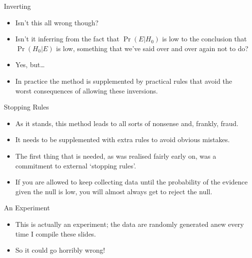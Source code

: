 \documentclass[
  ignorenonframetext,
]{beamer}
\providecommand{\tightlist}{%
  \setlength{\itemsep}{0pt}\setlength{\parskip}{0pt}}
\renewcommand{\,}{\text{, }}
\begin{document}
\begin{frame}{Inverting}
\protect\hypertarget{inverting-1}{}

\begin{itemize}
\tightlist
\item
  Isn't this all wrong though?
\item
  Isn't it inferring from the fact that \(\Pr(E | H_0)\) is low to the
  conclusion that \(\Pr(H_0 | E)\) is low, something that we've said
  over and over again not to do? \pause
\item
  Yes, but\ldots{} \pause
\item
  In practice the method is supplemented by practical rules that avoid
  the worst consequences of allowing these inversions.
\end{itemize}

\end{frame}

\begin{frame}{Stopping Rules}
\protect\hypertarget{stopping-rules}{}

\begin{itemize}
\tightlist
\item
  As it stands, this method leads to all sorts of nonsense and, frankly,
  fraud.
\item
  It needs to be supplemented with extra rules to avoid obvious
  mistakes.
\item
  The first thing that is needed, as was realised fairly early on, was a
  commitment to external `stopping rules'.
\item
  If you are allowed to keep collecting data until the probability of
  the evidence given the null is low, you will almost always get to
  reject the null.
\end{itemize}

\end{frame}

\begin{frame}{An Experiment}
\protect\hypertarget{an-experiment}{}

\begin{itemize}
\tightlist
\item
  This is actually an experiment; the data are randomly generated anew
  every time I compile these slides.
\item
  So it could go horribly wrong!
\end{itemize}

\end{frame}
\end{document}
